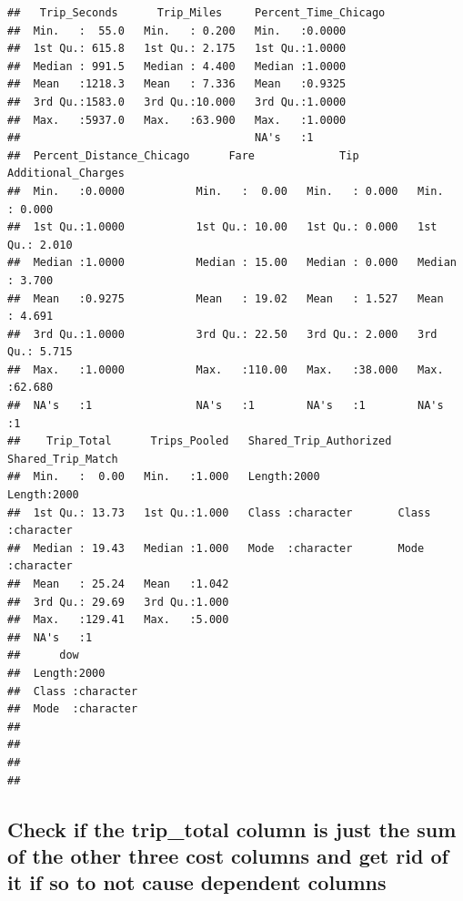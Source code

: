 \documentclass[
]{article}
\begin{document}
\begin{verbatim}
##   Trip_Seconds      Trip_Miles     Percent_Time_Chicago
##  Min.   :  55.0   Min.   : 0.200   Min.   :0.0000      
##  1st Qu.: 615.8   1st Qu.: 2.175   1st Qu.:1.0000      
##  Median : 991.5   Median : 4.400   Median :1.0000      
##  Mean   :1218.3   Mean   : 7.336   Mean   :0.9325      
##  3rd Qu.:1583.0   3rd Qu.:10.000   3rd Qu.:1.0000      
##  Max.   :5937.0   Max.   :63.900   Max.   :1.0000      
##                                    NA's   :1           
##  Percent_Distance_Chicago      Fare             Tip         Additional_Charges
##  Min.   :0.0000           Min.   :  0.00   Min.   : 0.000   Min.   : 0.000    
##  1st Qu.:1.0000           1st Qu.: 10.00   1st Qu.: 0.000   1st Qu.: 2.010    
##  Median :1.0000           Median : 15.00   Median : 0.000   Median : 3.700    
##  Mean   :0.9275           Mean   : 19.02   Mean   : 1.527   Mean   : 4.691    
##  3rd Qu.:1.0000           3rd Qu.: 22.50   3rd Qu.: 2.000   3rd Qu.: 5.715    
##  Max.   :1.0000           Max.   :110.00   Max.   :38.000   Max.   :62.680    
##  NA's   :1                NA's   :1        NA's   :1        NA's   :1         
##    Trip_Total      Trips_Pooled   Shared_Trip_Authorized Shared_Trip_Match 
##  Min.   :  0.00   Min.   :1.000   Length:2000            Length:2000       
##  1st Qu.: 13.73   1st Qu.:1.000   Class :character       Class :character  
##  Median : 19.43   Median :1.000   Mode  :character       Mode  :character  
##  Mean   : 25.24   Mean   :1.042                                            
##  3rd Qu.: 29.69   3rd Qu.:1.000                                            
##  Max.   :129.41   Max.   :5.000                                            
##  NA's   :1                                                                 
##      dow           
##  Length:2000       
##  Class :character  
##  Mode  :character  
##                    
##                    
##                    
## 
\end{verbatim}

\subsection{Check if the trip\_total column is just the sum of the other
three cost columns and get rid of it if so to not cause dependent
columns}\label{check-if-the-trip_total-column-is-just-the-sum-of-the-other-three-cost-columns-and-get-rid-of-it-if-so-to-not-cause-dependent-columns}
\end{document}
